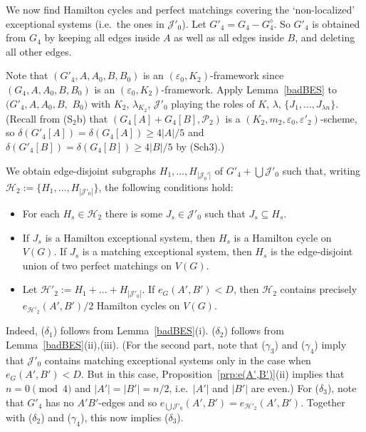 \documentclass{memo-l}
\def\COMMENT#1{}
\def\cP{\mathcal{P}}
\def\eps{\varepsilon}
\def\cJ{\mathcal{J}}
\numberwithin{section}{chapter}
\numberwithin{equation}{section}
\numberwithin{firstthm}{section}
\numberwithin{figure}{section}
\begin{document}
{We now find Hamilton cycles and perfect matchings covering the `non-localized' exceptional systems (i.e.~the ones in $\mathcal{J}'_0$).
Let $G'_4 = G_4 - G_4^{\diamond}$. So $G'_4$ is obtained from $G_4$ by keeping all edges inside $A$ as well as all edges inside $B$,
and deleting all other edges.%
   \COMMENT{Daniela: previously had "Let $G'_4:= G_4[A] + G_4[B]$. Note that $G'_4 = G_4 - G_4^{\diamond}$." But then $G'_4$ doesn't contain $V_0$
and so $(G'_4,A,A_0,B,B_0)$ wouldn't be an $(\eps_0,K_2)$-framework}
Note that $(G'_4,A,A_0,B,B_0)$ is an $(\eps_0,K_2)$-framework since $(G_4,A,A_0,B,B_0)$ is an $(\eps_0,K_2)$-framework. 
Apply Lemma~\ref{badBES} to $(G'_4,A,A_0,B,$ $B_0)$ with $K_2$, $ \lambda_{K_2}$, $\cJ'_0$ playing the roles of $K$, $\lambda$, $\{ J_1, \dots, J_{\lambda n} \}$.
(Recall from (S$_2$b) that $(G_4[A] +G_4[B], \cP_2)$ is a $(K_2, m_2, \eps_0, \eps'_2)$-scheme, so $\delta(G'_4[A])=\delta(G_4[A]) \ge 4|A|/5$
and $\delta(G'_4[B])=\delta(G_4[B]) \ge 4|B|/5$ by (Sch3).)%
   \COMMENT{Daniela: added $\delta(G'_4[A])=$ and similarly for $B$} 
We obtain edge-disjoint subgraphs $H_1, \dots, H_{|\mathcal{J}_0'|}$ of $G'_4 + \bigcup \mathcal{J}'_0$ such that,
writing $\mathcal{H}_2:=\{H_1, \dots, H_{|\mathcal{J}'_0|}\}$, the following conditions hold:
\begin{itemize}
\item[($\delta_1$)] For each $H_s\in \mathcal{H}_2$ there is some $J_s\in \mathcal{J}'_0$ such that $J_s\subseteq H_s$.
\item[($\delta_2$)] If $J_s$ is a Hamilton exceptional system, then $H_s$ is a Hamilton cycle on $V(G)$. If
$J_s$ is a matching exceptional system, then $H_s$ is the edge-disjoint union of two perfect matchings on $V(G)$.
\item[($\delta_3$)] Let $\mathcal{H}'_2:=H_1+ \dots +H_{|\mathcal{J}'_0|}$. If $e_G(A',B') < D$, then $\mathcal{H}_2$ contains precisely $e_{\mathcal{H}'_2}(A',B')/2$ Hamilton cycles on $V(G)$.
\end{itemize}
Indeed, ($\delta_1$) follows from Lemma~\ref{badBES}(i). 
($\delta_2$) follows from Lemma~\ref{badBES}(ii),(iii).
(For the second part, note that ($\gamma_3$) and ($\gamma_4$) imply that $\cJ'_0$ contains matching exceptional systems only in the case when
$e_G(A',B') < D$. But in this case, Proposition~\ref{prp:e(A',B')}(ii) implies that $n = 0 \pmod 4$ and $|A'| = |B'| = n/2$, i.e.~$|A'|$ and $|B'|$ are even.)
For ($\delta_3$), note that $G'_4$ has no $A'B'$-edges
and so $e_{ \bigcup\mathcal{J}'_0}(A',B')=e_{\mathcal{H}'_2}(A',B')$.
Together with ($\delta_2$) and ($\gamma_4$), this now implies ($\delta_3$).%
\COMMENT{Deryk rephrased this paragraph}

}
\end{document}
